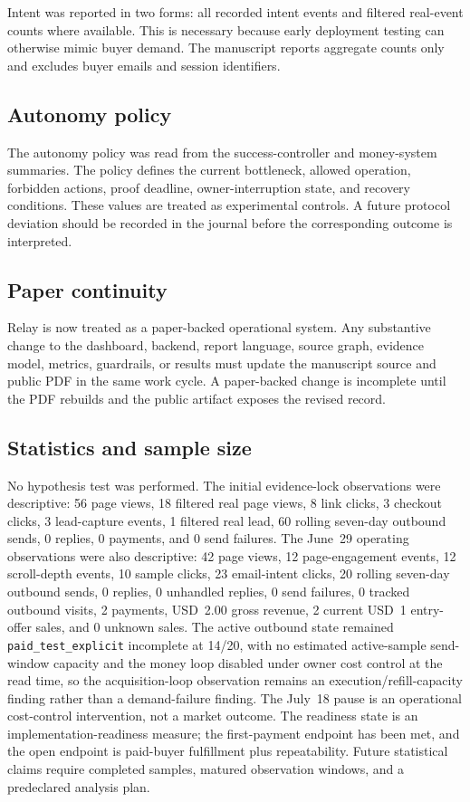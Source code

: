 \documentclass[12pt,letterpaper]{article}
\begin{document}
Intent was reported in two forms: all recorded intent events and filtered real-event counts where available. This is necessary because early deployment testing can otherwise mimic buyer demand. The manuscript reports aggregate counts only and excludes buyer emails and session identifiers.

\subsection{Autonomy policy}

The autonomy policy was read from the success-controller and money-system summaries. The policy defines the current bottleneck, allowed operation, forbidden actions, proof deadline, owner-interruption state, and recovery conditions. These values are treated as experimental controls. A future protocol deviation should be recorded in the journal before the corresponding outcome is interpreted.

\subsection{Paper continuity}

Relay is now treated as a paper-backed operational system. Any substantive change to the dashboard, backend, report language, source graph, evidence model, metrics, guardrails, or results must update the manuscript source and public PDF in the same work cycle. A paper-backed change is incomplete until the PDF rebuilds and the public artifact exposes the revised record.

\subsection{Statistics and sample size}

No hypothesis test was performed. The initial evidence-lock observations were descriptive: 56 page views, 18 filtered real page views, 8 link clicks, 3 checkout clicks, 3 lead-capture events, 1 filtered real lead, 60 rolling seven-day outbound sends, 0 replies, 0 payments, and 0 send failures. The June~29 operating observations were also descriptive: 42 page views, 12 page-engagement events, 12 scroll-depth events, 10 sample clicks, 23 email-intent clicks, 20 rolling seven-day outbound sends, 0 replies, 0 unhandled replies, 0 send failures, 0 tracked outbound visits, 2 payments, USD~2.00 gross revenue, 2 current USD~1 entry-offer sales, and 0 unknown sales. The active outbound state remained \texttt{paid\_test\_explicit} incomplete at 14/20, with no estimated active-sample send-window capacity and the money loop disabled under owner cost control at the read time, so the acquisition-loop observation remains an execution/refill-capacity finding rather than a demand-failure finding. The July~18 pause is an operational cost-control intervention, not a market outcome. The readiness state is an implementation-readiness measure; the first-payment endpoint has been met, and the open endpoint is paid-buyer fulfillment plus repeatability. Future statistical claims require completed samples, matured observation windows, and a predeclared analysis plan.
\end{document}
